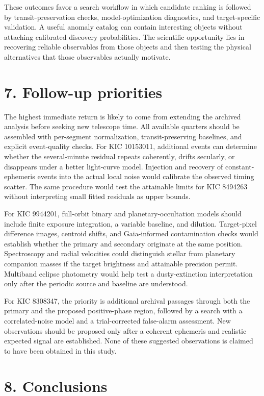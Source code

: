\documentclass[
  english,
]{article}
\begin{document}
These outcomes favor a search workflow in which candidate ranking is
followed by transit-preservation checks, model-optimization diagnostics,
and target-specific validation. A useful anomaly catalog can contain
interesting objects without attaching calibrated discovery
probabilities. The scientific opportunity lies in recovering reliable
observables from those objects and then testing the physical
alternatives that those observables actually motivate.

\section{7. Follow-up priorities}\label{follow-up-priorities}

The highest immediate return is likely to come from extending the
archived analysis before seeking new telescope time. All available
quarters should be assembled with per-segment normalization,
transit-preserving baselines, and explicit event-quality checks. For KIC
10153011, additional events can determine whether the several-minute
residual repeats coherently, drifts secularly, or disappears under a
better light-curve model. Injection and recovery of constant-ephemeris
events into the actual local noise would calibrate the observed timing
scatter. The same procedure would test the attainable limits for KIC
8494263 without interpreting small fitted residuals as upper bounds.

For KIC 9944201, full-orbit binary and planetary-occultation models
should include finite exposure integration, a variable baseline, and
dilution. Target-pixel difference images, centroid shifts, and
Gaia-informed contamination checks would establish whether the primary
and secondary originate at the same position. Spectroscopy and radial
velocities could distinguish stellar from planetary companion masses if
the target brightness and attainable precision permit. Multiband eclipse
photometry would help test a dusty-extinction interpretation only after
the periodic source and baseline are understood.

For KIC 8308347, the priority is additional archival passages through
both the primary and the proposed positive-phase region, followed by a
search with a correlated-noise model and a trial-corrected false-alarm
assessment. New observations should be proposed only after a coherent
ephemeris and realistic expected signal are established. None of these
suggested observations is claimed to have been obtained in this study.

\section{8. Conclusions}\label{conclusions}
\end{document}
